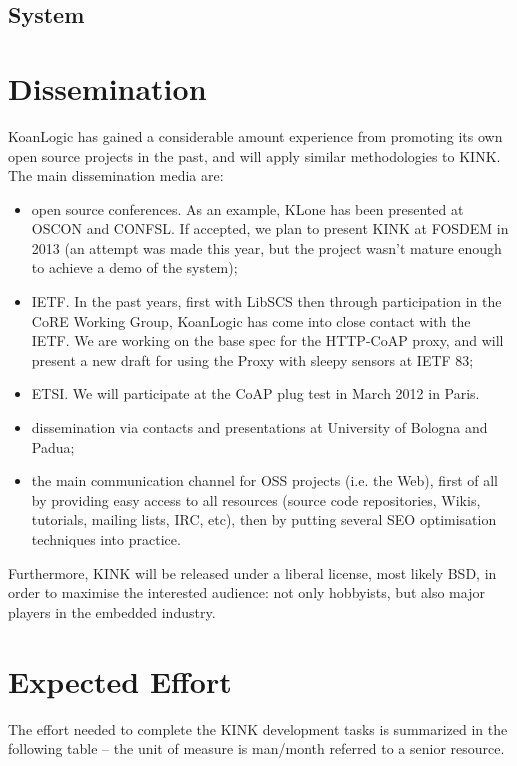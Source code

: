 \documentclass[12pt]{article}
\begin{document}
\subsection{System}


\section{Dissemination}
KoanLogic has gained a considerable amount experience from promoting its own open source projects in the past, and will apply similar methodologies to KINK. The main dissemination media are:
\begin{itemize}
\item open source conferences. As an example, KLone has been presented at OSCON and CONFSL. If accepted, we plan to present KINK at FOSDEM in 2013 (an attempt was made this year, but the project wasn't mature enough to achieve a demo of the system);
\item IETF. In the past years, first with LibSCS then through participation in the CoRE Working Group, KoanLogic has come into close contact with the IETF.  We are working on the base spec for the HTTP-CoAP proxy, and will present a new draft for using the Proxy with sleepy sensors at IETF 83;
\item ETSI. We will participate at the CoAP plug test in March 2012 in Paris.
\item dissemination via contacts and presentations at University of Bologna and Padua;
\item the main communication channel for OSS projects (i.e. the Web), first of all by providing easy access to all resources (source code repositories, Wikis, tutorials, mailing lists, IRC, etc), then by putting several SEO optimisation techniques into practice.
\end{itemize}

Furthermore, KINK will be released under a liberal license, most likely BSD, in order to maximise the interested audience: not only hobbyists, but also major players in the embedded industry.

\section{Expected Effort}
The effort needed to complete the KINK development tasks is summarized in the following table -- the unit of measure is man/month referred to a senior resource.
\end{document}
